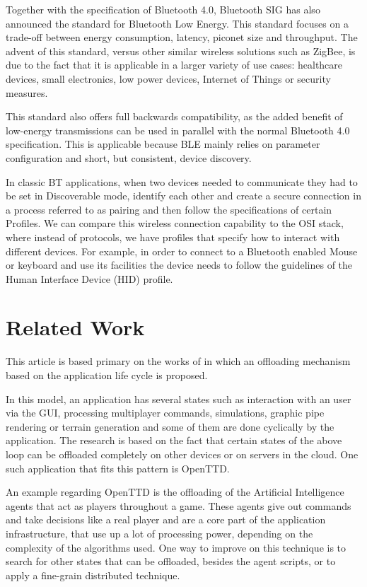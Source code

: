 \documentclass[twoside]{article}
\begin{document}
\begin{multicols}{2}
Together with the specification of Bluetooth 4.0, Bluetooth SIG has also announced the standard for Bluetooth Low Energy. This standard focuses on a trade-off between energy consumption, latency, piconet size and throughput. The advent of this standard, versus other similar wireless solutions such as ZigBee, is due to the fact that it is applicable in a larger variety of use cases: healthcare devices, small electronics, low power devices, Internet of Things
or security measures.

This standard also offers full backwards compatibility, as the added benefit of low-energy transmissions can be used in parallel with the normal Bluetooth 4.0 specification. This is applicable because BLE mainly relies on parameter configuration and short, but consistent, device discovery.

In classic BT applications, when two devices needed to communicate they had to be set in Discoverable mode, identify each other and create a secure connection in a process referred to as pairing and then follow the specifications of certain Profiles. We can compare this wireless connection capability to the OSI stack, where instead of protocols, we have profiles that specify how to interact with different devices. For example, in order to connect to a Bluetooth enabled
Mouse or keyboard and use its facilities the device needs to follow the guidelines of the Human Interface Device (HID) profile.

\section{Related Work}
\label{relatedwork}

This article is based primary on the works of \cite{Alex} in which an offloading mechanism based on the application life cycle is proposed.

In this model, an application has several states such as interaction with an user via the GUI, processing multiplayer commands, simulations, graphic pipe rendering or terrain generation and some of them are done cyclically by the application. The research is based on the fact that certain states of the above loop can be offloaded completely on other devices or on servers in the cloud. One such application that fits this pattern is OpenTTD. 

An example regarding OpenTTD is the offloading of the Artificial Intelligence agents that act as players throughout a game. These agents give out commands and take decisions like a real player and are a core part of the application infrastructure, that use up a lot of processing power, depending on the complexity of the algorithms used. One way to improve on this technique is to search for other states that can be offloaded, besides the agent scripts, or to apply a fine-grain distributed technique. 


\end{multicols}
\end{document}
